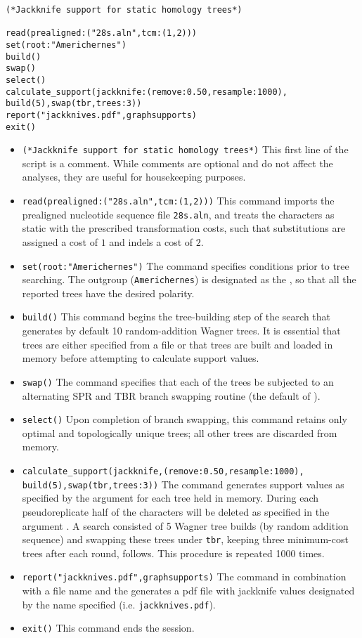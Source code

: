 \begin{verbatim}
(*Jackknife support for static homology trees*)

read(prealigned:("28s.aln",tcm:(1,2)))
set(root:"Americhernes")
build()
swap()
select()
calculate_support(jackknife:(remove:0.50,resample:1000), 
build(5),swap(tbr,trees:3))
report("jackknives.pdf",graphsupports)
exit()
\end{verbatim}

\begin{itemize}
\item \texttt{(*Jackknife support for static homology trees*)} This
first line of the script is a comment. While
 comments are optional and do not affect the analyses, they are
 useful for housekeeping purposes.
\item \texttt{read(prealigned:("28s.aln",tcm:(1,2)))} This command
imports the prealigned nucleotide sequence file \texttt{28s.aln},
and treats the characters as static with the prescribed transformation
costs, such that substitutions are assigned a cost of $ 1 $ and
indels a cost of $ 2$.  
\item \texttt{set(root:"Americhernes")} The  
command specifies conditions prior to tree searching.
The outgroup (\texttt{Americhernes}) is designated as the
, so that all the reported trees have the desired
polarity.  
\item \texttt{build()} This command begins the tree-building
step of the search that generates by default 10 random-addition
Wagner trees. It is essential that trees are either specified from
a file or that trees are built and loaded in memory before attempting
to calculate support values.  
\item \texttt{swap()} The  command specifies 
that each of the trees be subjected to an alternating SPR and TBR 
branch swapping routine (the default of \poy).  
\item \texttt{select()} Upon completion of branch swapping, this command
retains only optimal and topologically unique trees; all other trees
are discarded from memory.  
\item \texttt{calculate\_support(jackknife,(remove:0.50,resample:1000),\\
build(5),swap(tbr,trees:3))} The 
command generates support values as specified by the
 argument for each tree held in memory.
During each pseudoreplicate half of the characters will be deleted
as specified in the argument . A search
consisted of 5 Wagner tree builds (by random addition sequence) and
swapping these trees under \texttt{tbr}, keeping three minimum-cost
trees after each round, follows.  This procedure is repeated 1000
times.  
\item \texttt{report("jackknives.pdf",graphsupports)}  The
 command in combination with a file name and the
 generates a pdf file with jackknife
values designated by the name specified (i.e. \texttt{jackknives.pdf}).
\item \texttt{exit()} This command ends the \poy session.
\end{itemize}

